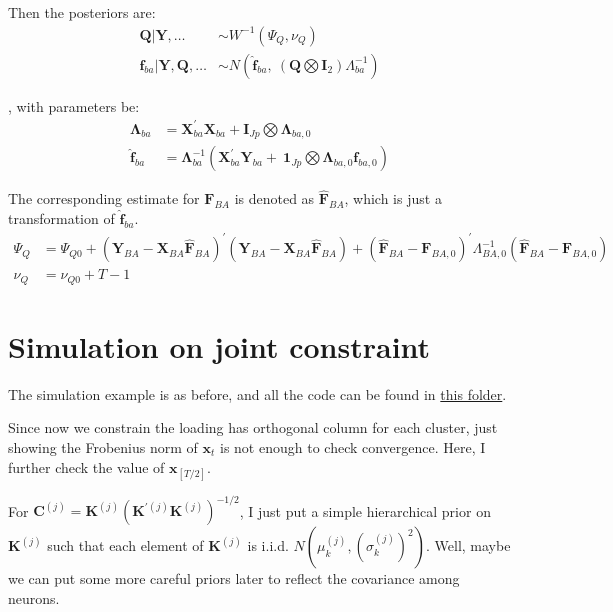 \documentclass[]{article}
\begin{document}
Then the posteriors are:
\begin{align*}
	\mathbf{Q}|\mathbf{Y},\ldots &\sim W^{- 1}(\Psi_{Q},\nu_{Q})\\
	\mathbf{f}_{ba}|\mathbf{Y},\mathbf{Q},\ldots &\sim N({\widehat{\mathbf{f}}}_{ba},\ (\mathbf{Q}\bigotimes \mathbf{I}_{2})\Lambda_{ba}^{- 1})
\end{align*}

, with parameters be:
\begin{align*}
	\bm{\Lambda}_{ba} &= \mathbf{X}_{ba}^{'}\mathbf{X}_{ba} + \mathbf{I}_{Jp}\bigotimes\bm{\Lambda}_{ba,0}\\
	{\widehat{\mathbf{f}}}_{ba} &= \bm{\Lambda}_{ba}^{- 1}\left( \mathbf{X}_{ba}^{'}\mathbf{Y}_{ba} + \ \mathbf{1}_{Jp}\bigotimes\bm{\Lambda}_{ba,0}\mathbf{f}_{ba,0} \right)
\end{align*}

The corresponding estimate for \(\mathbf{F}_{BA}\) is denoted as
\({\widehat{\mathbf{F}}}_{BA}\), which is just a transformation of \({\widehat{\mathbf{f}}}_{ba}\).
\begin{align*}
	\Psi_{Q} &= \Psi_{Q0} + \left( \mathbf{Y}_{BA} - \mathbf{X}_{BA}{\widehat{\mathbf{F}}}_{BA} \right)^{'}\left( \mathbf{Y}_{BA} - \mathbf{X}_{BA}{\widehat{\mathbf{F}}}_{BA} \right) + \left( {\widehat{\mathbf{F}}}_{BA} - \mathbf{F}_{BA,0} \right)^{'}\Lambda_{BA,0}^{- 1}\left( {\widehat{\mathbf{F}}}_{BA} - \mathbf{F}_{BA,0} \right)\\
	\nu_{Q} &= \nu_{Q0} + T - 1
\end{align*}

\section{Simulation on joint constraint}
The simulation example is as before, and all the code can be found in \href{https://github.com/weigcdsb/state-space-clustering/tree/main/LDS/blkDiag}{this folder}.

Since now we constrain the loading has orthogonal column for each cluster, just showing the Frobenius norm of $\mathbf{x}_t$ is not enough to check convergence. Here, I further check the value of $\mathbf{x}_{[T/2]}$.

For \(\mathbf{C}^{(j)} = \mathbf{K}^{(j)}\left( \mathbf{K}^{'(j)}\mathbf{K}^{(j)} \right)^{- 1/2}\), I just put a simple hierarchical prior on $\mathbf{K}^{(j)}$ such that each element of $\mathbf{K}^{(j)}$ is i.i.d. $N(\mu_{k}^{(j)}, (\sigma^{(j)}_{k})^2)$. Well, maybe we can put some more careful priors later to reflect the covariance among neurons.
\end{document}
